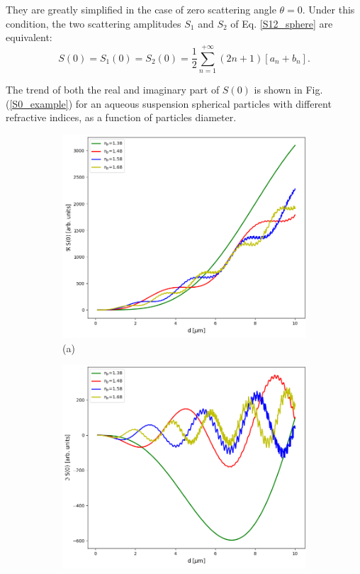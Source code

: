 \documentclass[a4paper, 11pt]{report}
\begin{document}
They are greatly simplified in the case of zero scattering angle $\theta=0$. Under this condition, the two scattering amplitudes $S_1$ and $S_2$ of Eq. \ref{S12_sphere} are equivalent:
\begin{equation}
	S\left( 0 \right) = S_{1}\left( 0 \right) = S_{2}\left( 0 \right) = \dfrac{1}{2} \sum\limits_{n=1}^{+\infty} \left( 2n+1 \right)\left[ a_{n} + b_{n} \right] .
	\label{S0_sphere}
\end{equation}

The trend of both the real and imaginary part of $S\left( 0 \right)$ is shown in Fig.(\ref{S0_example}) for an aqueous suspension spherical particles with different refractive indices, as a function of particles diameter.
\begin{figure}[!htb]
	\captionsetup[subfigure]{labelformat=empty}
	\begin{subfigure}{.5\textwidth}
	\centering	
	\includegraphics[scale=0.37]{ReS0_example.png}
	\caption{(a)}
	\end{subfigure} 
	\begin{subfigure}{.5\textwidth}
	\centering
	\includegraphics[scale=0.37]{ImS0_example.png}

\end{subfigure}
\end{figure}
\end{document}
